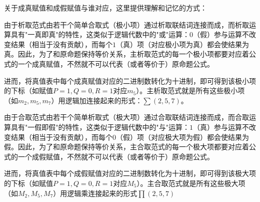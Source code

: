 \documentclass[lang=cn,11pt]{elegantbook}
\begin{document}
关于成真赋值和成假赋值与谁对应，这里提供理解和记忆的方式：

由于析取范式由若干个简单合取式（极小项）通过析取联结词连接而成，而析取运算具有"一真即真"的特性，这类似于逻辑代数中的"或"运算：$0$（假）参与运算不改变结果（相当于没有贡献），而每个$1$（真）项（对应极小项为真）都会使结果为真。因此，为了和原命题保持等价关系，主析取范式的每一个极小项都要对应着公式的一个成真赋值，不然就不可以代表（或者等价于）原命题公式。

进而，将真值表中每个成真赋值对应的二进制数转化为十进制，即可得到该极小项的下标（如赋值$P=1, Q=0, R=1$对应$m_5$）。主析取范式就是所有这些极小项（如$m_2, m_5, m_7$）用逻辑加连接起来的形式：$\sum(2,5,7)$。

由于合取范式由若干个简单析取式（极大项）通过合取联结词连接而成，而合取运算具有"一假即假"的特性，这类似于逻辑代数中的"与"运算：$1$（真）参与运算不改变结果（相当于没有贡献），而每个$0$（假）项（对应极大项为假）都会使结果为假。因此，为了和原命题保持等价关系，主合取范式的每一个极大项都要对应着公式的一个成假赋值，不然就不可以代表（或者等价于）原命题公式。

进而，将真值表中每个成假赋值对应的二进制数转化为十进制，即可得到该极大项的下标（如赋值$P=1, Q=0, R=1$对应$M_5$）。主合取范式就是所有这些极大项（如$M_2, M_5, M_7$）用逻辑乘连接起来的形式$\prod(2,5,7)$
\end{document}
